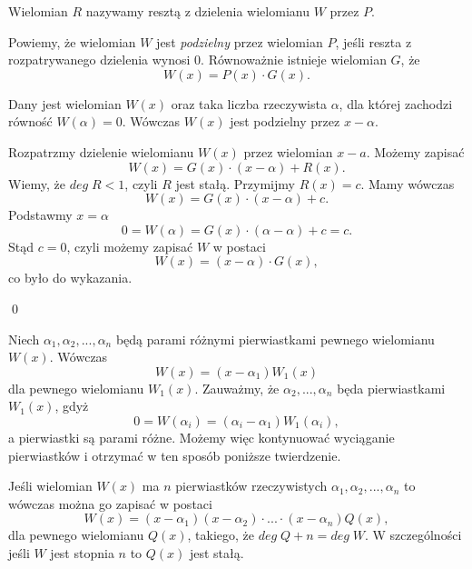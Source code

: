\vspace{10px}



\noindent
Wielomian $R$ nazywamy resztą z dzielenia wielomianu $W$ przez $P$.

\vspace{10px}

\noindent
Powiemy, że wielomian $W$ jest \textit{podzielny} przez wielomian $P$, jeśli reszta z rozpatrywanego dzielenia wynosi $0$. Równoważnie istnieje wielomian $G$, że
\[
    W(x) = P(x) \cdot G(x).
\]

\vspace{10px}


\noindent
Dany jest wielomian $W(x)$ oraz taka liczba rzeczywista $\alpha$, dla której zachodzi równość $W(\alpha) = 0$. Wówczas $W(x)$ jest podzielny przez $x - \alpha$.

\newpage


\noindent
Rozpatrzmy dzielenie wielomianu $W(x)$ przez wielomian $x - a$. Możemy zapisać
\[
    W(x) = G(x) \cdot (x - \alpha) + R(x).
\]
Wiemy, że $deg \; R < 1$, czyli $R$ jest stałą. Przymijmy $R(x) = c$. Mamy wówczas
\[
    W(x) = G(x) \cdot (x - \alpha) + c.
\]
Podstawmy $x = \alpha$
\[
    0 = W(\alpha) = G(x) \cdot (\alpha - \alpha) + c = c.
\]
Stąd $c = 0$, czyli możemy zapisać $W$ w postaci
\[
    W(x) = (x - \alpha) \cdot G(x),
\]
co było do wykazania.

\qed

\vspace{5px}

\noindent
Niech $\alpha_1, \alpha_2, ..., \alpha_n$ będą parami różnymi pierwiastkami pewnego wielomianu $W(x)$. Wówczas 
\[
    W(x) = (x - \alpha_1)W_1(x)
\]
dla pewnego wielomianu $W_1(x)$. Zauważmy, że $\alpha_2, ..., \alpha_n$ będa pierwiastkami $W_1(x)$, gdyż
\[
    0 = W(\alpha_i) = (\alpha_i - \alpha_1)W_1(\alpha_i),
\]
a pierwiastki są parami różne. Możemy więc kontynuować wyciąganie pierwiastków i otrzymać w ten sposób poniższe twierdzenie.

\vspace{5px}


\noindent
Jeśli wielomian $W(x)$ ma $n$ pierwiastków rzeczywistych $\alpha_1, \alpha_2, ..., \alpha_n$ to wówczas można go zapisać w postaci
\[
    W(x) = (x - \alpha_1)(x - \alpha_2) \cdot ... \cdot (x - \alpha_n) Q(x),
\]
dla pewnego wielomianu $Q(x)$, takiego, że $deg\; Q + n = deg\; W$. W szczególności jeśli $W$ jest stopnia $n$ to $Q(x)$ jest stałą.

